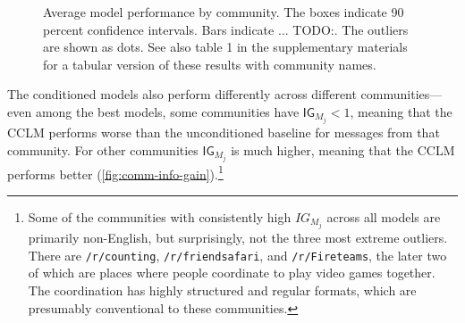\documentclass[11pt]{article}
\newcommand\Ppl{\mathsf{Ppl}}
\newcommand\IG{\mathsf{IG}}
\newcommand\subreddit[1]{\texttt{/r/#1}}
\begin{document}
\newcommand{\modelboxplot}[3]{
  \addplot+[
    boxplot={draw position=#3, box extend=0.3}, 
    draw=#2, mark=*, mark options={fill=#2, scale=0.5}, solid, fill=#2!10,
    area legend] 
    table [y=#1] {floats/comm.csv};
}
\begin{figure}[t]
\caption{
  Average model performance by community.
  The boxes indicate 90 percent confidence intervals. Bars indicate ... TODO:. The outliers are shown as dots.
   See also table 1 in the supplementary materials
   for a tabular version of these results with community names.
}
\label{fig:comm-stratified-box}
\end{figure}

The conditioned models also perform differently across different communities---%
even among the best models, some communities have $\IG_{M_j} < 1$,
meaning that the CCLM performs worse than the unconditioned baseline for 
messages from that community.
For other communities $\IG_{M_j}$ is much higher, meaning that the CCLM performs better  
(\cref{fig:comm-info-gain}).\footnote{
  Some of the communities with consistently high $IG_{M_j}$ 
  across all models are primarily non-English, 
  but surprisingly, not the three most extreme
  outliers. There are \subreddit{counting}, \subreddit{friendsafari}, and \subreddit{Fireteams}, 
  the later two of which are places where people coordinate to play video games
  together. The coordination has highly structured and regular formats, which 
  are presumably conventional to these communities.}
\end{document}
